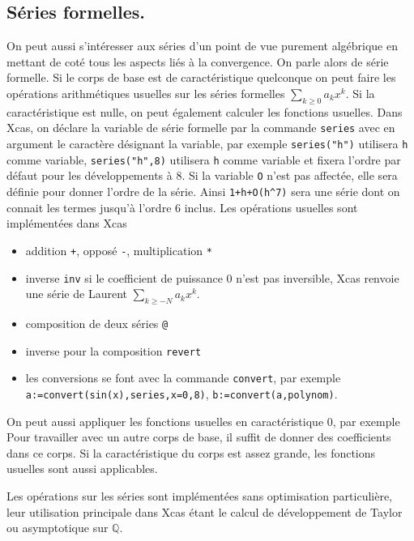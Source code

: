 \documentclass[a4paper,11pt]{article}
\begin{document}
\begin{giacjshere}
\subsection{S\'eries formelles.} 
On peut aussi s'int\'eresser aux s\'eries d'un point de vue purement
alg\'ebrique en mettant de cot\'e tous
les aspects li\'es \`a la convergence. On parle alors de s\'erie
formelle. Si le corps de base est de caract\'eristique quelconque
on peut faire les op\'erations arithm\'etiques usuelles sur les
s\'eries formelles $\sum_{k\geq 0} a_k x^k$. Si la caract\'eristique
est nulle, on peut \'egalement calculer les fonctions usuelles.
Dans Xcas, on d\'eclare la variable de s\'erie formelle par la commande
\verb|series| avec en argument le caract\`ere d\'esignant la variable, 
par exemple \verb|series("h")| utilisera \verb|h| comme variable,
\verb|series("h",8)| utilisera \verb|h| comme variable
et fixera l'ordre par d\'efaut pour les d\'eveloppements \`a 8. Si la
variable \verb|O| n'est pas affect\'ee, elle sera d\'efinie pour donner
l'ordre de la s\'erie. Ainsi \verb|1+h+O(h^7)| sera une s\'erie
dont on connait les termes jusqu'\`a l'ordre 6 inclus.
Les op\'erations usuelles sont impl\'ement\'ees dans Xcas
\begin{itemize}
\item addition \verb|+|, oppos\'e \verb|-|, multiplication \verb|*|
\item inverse \verb|inv| 
si le coefficient de puissance 0 n'est pas inversible, 
Xcas renvoie une s\'erie de Laurent
$\sum_{k\geq -N} a_k x^k$.
\item composition de deux s\'eries \verb|@|
\item inverse pour la composition \verb|revert|
\item les conversions se font avec la commande \verb|convert|, par
exemple \verb|a:=convert(sin(x),series,x=0,8)|,
\verb|b:=convert(a,polynom)|.
\end{itemize}
On peut aussi appliquer les fonctions usuelles en caract\'eristique 0, par
exemple
Pour travailler avec un autre corps de base, il suffit de donner des
coefficients dans ce corps. Si la caract\'eristique du corps est assez
grande, les fonctions usuelles sont aussi applicables.

Les op\'erations sur les s\'eries sont impl\'ement\'ees sans optimisation
particuli\`ere, leur utilisation principale dans Xcas \'etant le
calcul de d\'eveloppement de Taylor ou asymptotique sur $\mathbb{Q}$.


\end{giacjshere}
\end{document}
